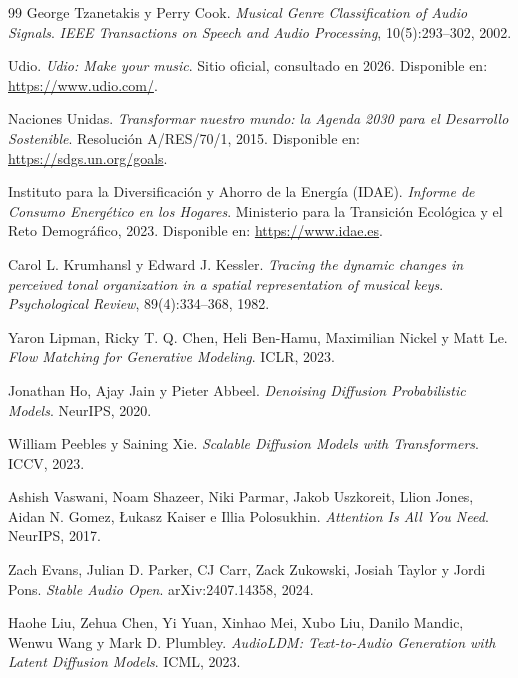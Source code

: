 \documentclass[%
    school=etsisi,%
    type=pfg,%
    degree=61CD,%
]{upm-report}
\begin{document}
\begin{thebibliography}{99}
George Tzanetakis y Perry Cook.
\newblock \emph{Musical Genre Classification of Audio Signals}.
\newblock \textit{IEEE Transactions on Speech and Audio Processing}, 10(5):293--302, 2002.

Udio.
\newblock \emph{Udio: Make your music}.
\newblock Sitio oficial, consultado en 2026.
\newblock Disponible en: \url{https://www.udio.com/}.

Naciones Unidas.
\newblock \emph{Transformar nuestro mundo: la Agenda 2030 para el Desarrollo Sostenible}.
\newblock Resoluci\'on A/RES/70/1, 2015.
\newblock Disponible en: \url{https://sdgs.un.org/goals}.

Instituto para la Diversificaci\'on y Ahorro de la Energ\'ia (IDAE).
\newblock \emph{Informe de Consumo Energ\'etico en los Hogares}.
\newblock Ministerio para la Transici\'on Ecol\'ogica y el Reto Demogr\'afico, 2023.
\newblock Disponible en: \url{https://www.idae.es}.

Carol L. Krumhansl y Edward J. Kessler.
\newblock \emph{Tracing the dynamic changes in perceived tonal organization in a spatial representation of musical keys}.
\newblock \textit{Psychological Review}, 89(4):334--368, 1982.

Yaron Lipman, Ricky T. Q. Chen, Heli Ben-Hamu, Maximilian Nickel y Matt Le.
\newblock \emph{Flow Matching for Generative Modeling}.
\newblock ICLR, 2023.

Jonathan Ho, Ajay Jain y Pieter Abbeel.
\newblock \emph{Denoising Diffusion Probabilistic Models}.
\newblock NeurIPS, 2020.

William Peebles y Saining Xie.
\newblock \emph{Scalable Diffusion Models with Transformers}.
\newblock ICCV, 2023.

Ashish Vaswani, Noam Shazeer, Niki Parmar, Jakob Uszkoreit, Llion Jones, Aidan N. Gomez, \L{}ukasz Kaiser e Illia Polosukhin.
\newblock \emph{Attention Is All You Need}.
\newblock NeurIPS, 2017.

Zach Evans, Julian D. Parker, CJ Carr, Zack Zukowski, Josiah Taylor y Jordi Pons.
\newblock \emph{Stable Audio Open}.
\newblock arXiv:2407.14358, 2024.

Haohe Liu, Zehua Chen, Yi Yuan, Xinhao Mei, Xubo Liu, Danilo Mandic, Wenwu Wang y Mark D. Plumbley.
\newblock \emph{AudioLDM: Text-to-Audio Generation with Latent Diffusion Models}.
\newblock ICML, 2023.

\end{thebibliography}
\end{document}
